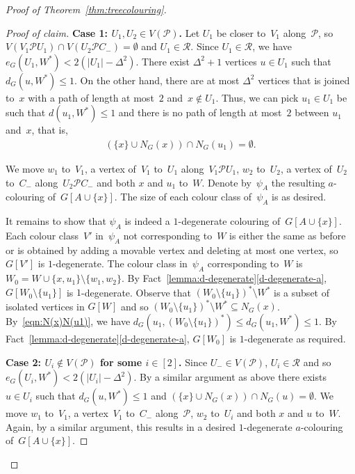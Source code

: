 \documentclass[11pt]{article}
\newenvironment{proofclaim}[1][Proof of claim]{\begin{proof}[#1]\renewcommand*{\qedsymbol}{\(\blacksquare\)}}{\end{proof}}
\theoremstyle{plain}
\numberwithin{equation}{section}
\begin{document}
\begin{proof}[Proof of Theorem~\ref{thm:treecolouring}]
\begin{proofclaim}
\noindent\textbf{Case 1: $U_1, U_2 \in V(\mathcal{P})$.}
Let $U_1$ be closer to~$V_1$ along~$\mathcal{P}$, so $V(V_1\mathcal{P}U_1) \cap V(U_2 \mathcal{P}C_-) = \emptyset$ and $U_1 \in \mathcal{R}$.
Since  $U_1 \in \mathcal{R}$, we have $e_G(U_1, W^*) < 2 (|U_1| -  \Delta^2)$.
There exist $\Delta^2+1$ vertices $u \in U_1$ such that $d_G(u, W^*) \le 1 $.
On the other hand,  there are at most $\Delta^2$ vertices that is joined to~$x$ with a path of length at most~$2$ and~$x \notin U_1$.
Thus, we can pick $u_1 \in U_1$ be such that $d(u_1, W^*) \le 1 $ and there is no path of length at most~$2$ between $u_1$ and~$x$, that is,
\begin{align}
	(\{x\} \cup N_G(x) ) \cap N_G(u_1) = \emptyset. \label{eqn:N(x)N(u1)}
\end{align}

We move $w_1$ to~$V_1$, a vertex of~$V_1$ to~$U_1$ along~$V_1\mathcal{P}U_1$, $w_2$ to~$U_2$, a vertex of~$U_2$ to~$C_-$ along~$U_2 \mathcal{P}C_-$ and both $x$ and $u_1$ to~$W$. Denote by~$\psi_A$ the resulting $a$-colouring of~$G[A \cup \{x\}]$.
The size of each colour class of~$\psi_A$ is as desired.

It remains to show that $\psi_A$ is indeed a $1$-degenerate colouring of~$G[A \cup \{x\}]$.
Each colour class~$V'$ in~$\psi_A$ not corresponding to~$W$ is either the same as before or is obtained by adding a movable vertex and deleting at most one vertex, so $G[V']$ is $1$-degenerate.
The colour class in~$\psi_A$ corresponding to~$W$ is $W_0 = W \cup \{x,u_1\} \setminus \{w_1,w_2\}$.
By Fact~\ref{lemma:d-degenerate}\ref{d-degenerate-a}, $G[W_0 \setminus \{u_1\}]$ is $1$-degenerate.
Observe that $(W_0 \setminus \{u_1\})^* \setminus W^*$ is a subset of isolated vertices in $G[W]$ and so $(W_0 \setminus \{u_1\})^* \setminus W^* \subseteq N_G(x)$.
By~\eqref{eqn:N(x)N(u1)}, we have $d_G(u_1, (W_0 \setminus \{u_1\})^*) \le d_G(u_1, W^*) \le 1$.
By Fact~\ref{lemma:d-degenerate}\ref{d-degenerate-a}, $G[W_0 ]$ is $1$-degenerate as required.


\noindent\textbf{Case 2: $U_i \notin V(\mathcal{P})$ for some $i \in [2]$.}
Since $U_- \in V(\mathcal{P})$, $U_i \in \mathcal{R}$ and so $e_G(U_i, W^*) < 2 (|U_i| -  \Delta^2)$.
By a similar argument as above there exists $u \in U_i$ such that $d_G(u, W^*) \le 1 $ and $(\{x\} \cup	N_G(x)) \cap N_G(u) = \emptyset$.
We move $w_1$ to~$V_1$, a vertex~$V_1$ to~$C_-$ along~$\mathcal{P}$, $w_2$ to~$U_i$ and both $x$ and $u$ to~$W$.
Again, by a similar argument, this results in a desired $1$-degenerate $a$-colouring of~$G[A \cup \{x\}]$.
\end{proofclaim}


\end{proof}
\end{document}
